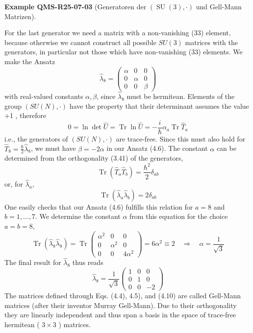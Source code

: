 \documentclass[10pt, letterpaper]{article}
\newcommand{\CustomHeading}[3]{%
  \par\medskip\noindent%
  \textbf{#1 #2} \textnormal{(#3)}.\enskip%
}
\newenvironment{EXA}[2]{\begin{unitbox}\CustomHeading{Example}{#1}{#2}}{\end{unitbox}}
\begin{document}
\begin{EXA}{QMS-R25-07-03}{Generatoren der $(\operatorname{SU}(3), \cdot)$ und Gell-Mann Matrizen}
For the last generator we need a matrix with a non-vanishing (33) element, because otherwise we cannot construct all possible $S U(3)$ matrices with the generators, in particular not those which have non-vanishing (33) elements. We make the Ansatz
$$
\hat{\lambda}_{8}=\left(\begin{array}{ccc}
\alpha & 0 & 0 \\
0 & \alpha & 0 \\
0 & 0 & \beta
\end{array}\right)
$$
with real-valued constants $\alpha, \beta$, since $\hat{\lambda}_{8}$ must be hermitean. Elements of the group $(S U(N), \cdot)$ have the property that their determinant assumes the value +1 , therefore
$$
0=\ln \operatorname{det} \hat{U}=\operatorname{Tr} \ln \hat{U}=-\frac{i}{\hbar} \alpha_{a} \operatorname{Tr} \hat{T}_{a}
$$
i.e., the generators of $(S U(N), \cdot)$ are trace-free. Since this must also hold for $\hat{T}_{8}=\frac{\hbar}{2} \hat{\lambda}_{8}$, we must have $\beta=-2 \alpha$ in our Ansatz (4.6). The constant $\alpha$ can be determined from the orthogonality (3.41) of the generators,
$$
\operatorname{Tr}\left(\hat{T}_{a} \hat{T}_{b}\right)=\frac{\hbar^{2}}{2} \delta_{a b}
$$
or, for $\hat{\lambda}_{a}$,
$$
\operatorname{Tr}\left(\hat{\lambda}_{a} \hat{\lambda}_{b}\right)=2 \delta_{a b}
$$
One easily checks that our Ansatz (4.6) fulfills this relation for $a=8$ and $b=1, \ldots, 7$. We determine the constant $\alpha$ from this equation for the choice $a=b=8$,
$$
\operatorname{Tr}\left(\hat{\lambda}_{8} \hat{\lambda}_{8}\right)=\operatorname{Tr}\left(\begin{array}{ccc}
\alpha^{2} & 0 & 0 \\
0 & \alpha^{2} & 0 \\
0 & 0 & 4 \alpha^{2}
\end{array}\right)=6 \alpha^{2} \equiv 2 \quad \Longrightarrow \quad \alpha=\frac{1}{\sqrt{3}}
$$
The final result for $\hat{\lambda}_{8}$ thus reads
$$
\hat{\lambda}_{8}=\frac{1}{\sqrt{3}}\left(\begin{array}{ccc}
1 & 0 & 0 \\
0 & 1 & 0 \\
0 & 0 & -2
\end{array}\right)
$$
The matrices defined through Eqs. (4.4), 4.5), and (4.10) are called Gell-Mann matrices (after their inventor Murray Gell-Mann). Due to their orthogonality they are linearly independent and thus span a basis in the space of trace-free hermitean ( $3 \times 3$ ) matrices.
\end{EXA}
\end{document}
